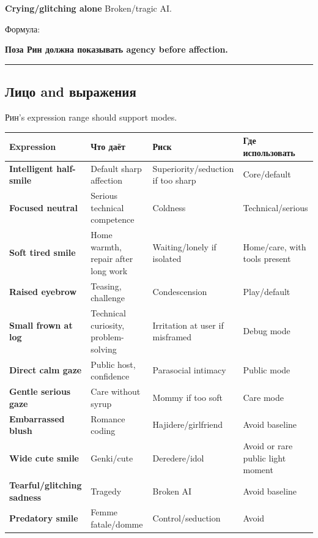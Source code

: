 \textbf{Crying/\hspace{0pt}glitching alone} Broken/\hspace{0pt}tragic AI.

Формула:

\textbf{Поза Рин должна показывать agency before affection.}

\begin{center}\rule{0.5\linewidth}{0.5pt}\end{center}

\subsection*{Лицо and выражения}

Рин's expression range should support modes.

\begin{longtable}{>{\raggedright\arraybackslash}p{}>{\raggedright\arraybackslash}p{}>{\raggedright\arraybackslash}p{}>{\raggedright\arraybackslash}p{}}
\toprule
Expression\strut & Что даёт\strut & Риск\strut & Где использовать\strut\tabularnewline
\midrule
\endhead
\textbf{Intelligent half-smile}\strut & Default sharp affection\strut & Superiority/\hspace{0pt}seduction if too sharp\strut & Core/\hspace{0pt}default\strut\tabularnewline
\textbf{Focused neutral}\strut & Serious technical competence\strut & Coldness\strut & Technical/\hspace{0pt}serious\strut\tabularnewline
\textbf{Soft tired smile}\strut & Home warmth, repair after long work\strut & Waiting/\hspace{0pt}lonely if isolated\strut & Home/\hspace{0pt}care, with tools present\strut\tabularnewline
\textbf{Raised eyebrow}\strut & Teasing, challenge\strut & Condescension\strut & Play/\hspace{0pt}default\strut\tabularnewline
\textbf{Small frown at log}\strut & Technical curiosity, problem-solving\strut & Irritation at user if misframed\strut & Debug mode\strut\tabularnewline
\textbf{Direct calm gaze}\strut & Public host, confidence\strut & Parasocial intimacy\strut & Public mode\strut\tabularnewline
\textbf{Gentle serious gaze}\strut & Care without syrup\strut & Mommy if too soft\strut & Care mode\strut\tabularnewline
\textbf{Embarrassed blush}\strut & Romance coding\strut & Hajidere/\hspace{0pt}girlfriend\strut & Avoid baseline\strut\tabularnewline
\textbf{Wide cute smile}\strut & Genki/\hspace{0pt}cute\strut & Deredere/\hspace{0pt}idol\strut & Avoid or rare public light moment\strut\tabularnewline
\textbf{Tearful/\hspace{0pt}glitching sadness}\strut & Tragedy\strut & Broken AI\strut & Avoid baseline\strut\tabularnewline
\textbf{Predatory smile}\strut & Femme fatale/\hspace{0pt}domme\strut & Control/\hspace{0pt}seduction\strut & Avoid\strut\tabularnewline
\bottomrule
\end{longtable}

